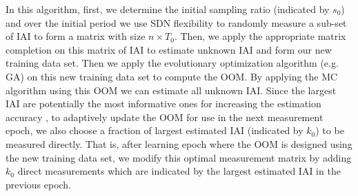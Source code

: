 In this algorithm, first, we determine the initial sampling ratio (indicated by $s_{0}$) and over the initial period we use SDN flexibility to randomly measure a sub-set of IAI to form a matrix with size $n \times T_{0}$. Then, we apply the appropriate matrix completion on this matrix of IAI to estimate unknown IAI and form our new training data set. Then we apply the evolutionary optimization algorithm (e.g. GA) on this new training data set to compute the OOM. By applying the MC algorithm using this OOM we can estimate all unknown IAI. Since the largest IAI are potentially the most informative ones for increasing the estimation accuracy \cite{IF14iSTAMP:2014}, to adaptively update the OOM for use in the next measurement epoch, we also choose a fraction of largest estimated IAI (indicated by $k_{0}$) to be measured directly. That is, after learning epoch where the OOM is designed using the new training data set, we modify this optimal measurement matrix by adding $k_{0}$ direct measurements which are indicated by the largest estimated IAI in the previous epoch. 


